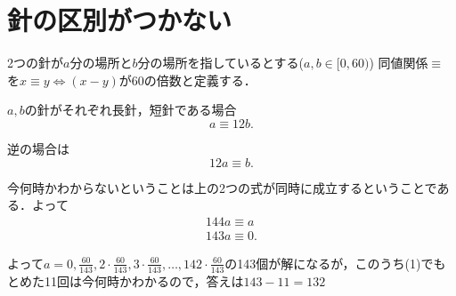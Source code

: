 \section{針の区別がつかない}
2つの針が$a$分の場所と$b$分の場所を指しているとする($a, b \in [0, 60)$)
同値関係$\equiv$を$x \equiv y \Leftrightarrow (x - y) \mathrm{が60の倍数}$と定義する．

$a,b$の針がそれぞれ長針，短針である場合
\[
a \equiv 12b.
\]

逆の場合は
\[
12a \equiv b.
\]

今何時かわからないということは上の2つの式が同時に成立するということである．よって
\begin{align*}
  144a \equiv a\\
  143a \equiv 0.
\end{align*}

よって$a = 0, \frac{60}{143}, 2\cdot\frac{60}{143}, 3\cdot\frac{60}{143}, \dots, 142\cdot\frac{60}{143}$の143個が解になるが，このうち(1)でもとめた11回は今何時かわかるので，答えは$143 - 11 = 132$

